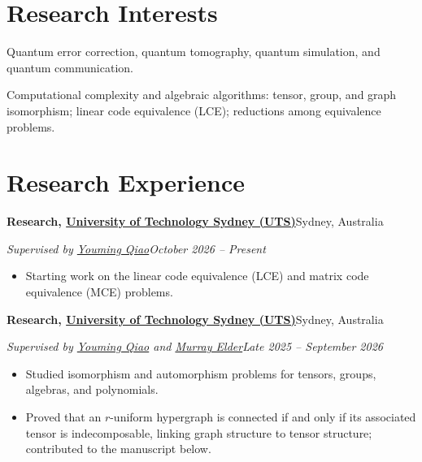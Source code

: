 \documentclass[11pt,a4paper]{article}
\newcommand{\cventry}[4]{%
  \textbf{#1}\hfill #2\par
  \vspace{1pt}%
  \textit{#3}\hfill \textit{#4}\par}
\newcommand{\interest}[2]{%
  \item[\textit{#1}] #2}
\begin{document}
\section{Research Interests}

\begin{description}[leftmargin=0pt, labelsep=0.5em, topsep=0pt, itemsep=3pt,
                    parsep=0pt, font=\normalfont]
  \interest{Quantum computing.}
    {Quantum error correction, quantum tomography, quantum simulation, and quantum communication.}
  \interest{Theoretical computer science.}
    {Computational complexity and algebraic algorithms: tensor, group, and graph isomorphism; linear code equivalence (LCE); reductions among equivalence problems.}
\end{description}

\section{Research Experience}

\cventry
  {Research, \href{https://www.uts.edu.au}{University of Technology Sydney (UTS)}}
  {Sydney, Australia}
  {Supervised by \href{https://sites.google.com/site/jimmyqiao86/}{Youming Qiao}}
  {October 2026 – Present}

\begin{itemize}
  \item Starting work on the linear code equivalence (LCE) and matrix code equivalence (MCE) problems.
\end{itemize}

\vspace{4pt}

\cventry
  {Research, \href{https://www.uts.edu.au}{University of Technology Sydney (UTS)}}
  {Sydney, Australia}
  {Supervised by \href{https://sites.google.com/site/jimmyqiao86/}{Youming Qiao} and \href{https://sites.google.com/site/melderau/}{Murray Elder}}
  {Late 2025 – September 2026}

\begin{itemize}
  \item Studied isomorphism and automorphism problems for tensors, groups, algebras, and polynomials.
  \item Proved that an $r$-uniform hypergraph is connected if and only if its associated tensor is indecomposable, linking graph structure to tensor structure; contributed to the manuscript below.
\end{itemize}
\end{document}
